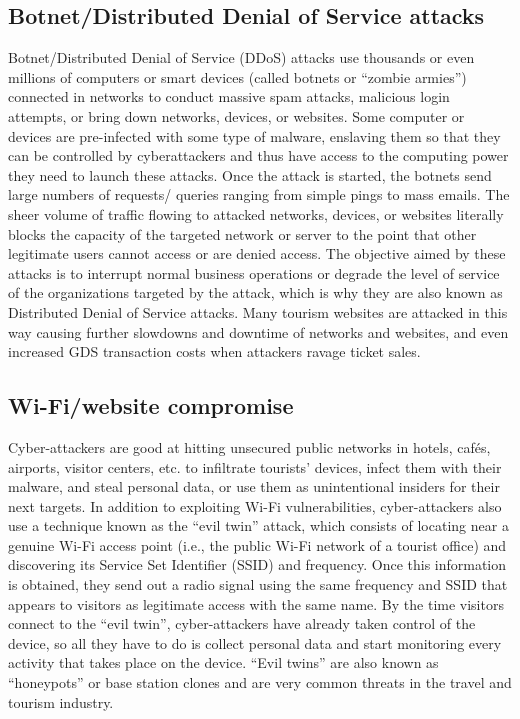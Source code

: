 \documentclass[
  letterpaper,
  DIV=11,
  numbers=noendperiod]{scrreprt}
\begin{document}
\hypertarget{botnetdistributed-denial-of-service-attacks}{%
\subsection{Botnet/Distributed Denial of Service
attacks}\label{botnetdistributed-denial-of-service-attacks}}

Botnet/Distributed Denial of Service (DDoS) attacks use thousands or
even millions of computers or smart devices (called botnets or ``zombie
armies'') connected in networks to conduct massive spam attacks,
malicious login attempts, or bring down networks, devices, or websites.
Some computer or devices are pre-infected with some type of malware,
enslaving them so that they can be controlled by cyberattackers and thus
have access to the computing power they need to launch these attacks.
Once the attack is started, the botnets send large numbers of requests/
queries ranging from simple pings to mass emails. The sheer volume of
traffic flowing to attacked networks, devices, or websites literally
blocks the capacity of the targeted network or server to the point that
other legitimate users cannot access or are denied access. The objective
aimed by these attacks is to interrupt normal business operations or
degrade the level of service of the organizations targeted by the
attack, which is why they are also known as Distributed Denial of
Service attacks. Many tourism websites are attacked in this way causing
further slowdowns and downtime of networks and websites, and even
increased GDS transaction costs when attackers ravage ticket sales.

\hypertarget{wi-fiwebsite-compromise}{%
\subsection{Wi-Fi/website compromise}\label{wi-fiwebsite-compromise}}

Cyber-attackers are good at hitting unsecured public networks in hotels,
cafés, airports, visitor centers, etc. to infiltrate tourists' devices,
infect them with their malware, and steal personal data, or use them as
unintentional insiders for their next targets. In addition to exploiting
Wi-Fi vulnerabilities, cyber-attackers also use a technique known as the
``evil twin'' attack, which consists of locating near a genuine Wi-Fi
access point (i.e., the public Wi-Fi network of a tourist office) and
discovering its Service Set Identifier (SSID) and frequency. Once this
information is obtained, they send out a radio signal using the same
frequency and SSID that appears to visitors as legitimate access with
the same name. By the time visitors connect to the ``evil twin'',
cyber-attackers have already taken control of the device, so all they
have to do is collect personal data and start monitoring every activity
that takes place on the device. ``Evil twins'' are also known as
``honeypots'' or base station clones and are very common threats in the
travel and tourism industry.
\end{document}
